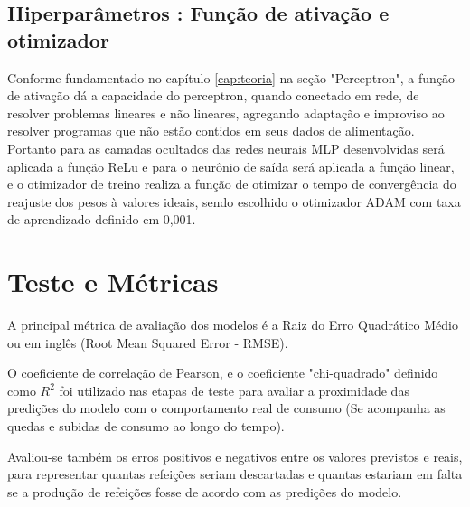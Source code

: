 	\subsection{Hiperparâmetros : Função de ativação e otimizador}
        Conforme fundamentado no capítulo \ref{cap:teoria} na seção "Perceptron", a função de ativação dá a capacidade do perceptron, quando conectado em rede, de resolver problemas lineares e não lineares, agregando adaptação e improviso ao resolver programas que não estão contidos em seus dados de alimentação.
        Portanto para as camadas ocultados das redes neurais MLP desenvolvidas será aplicada a função ReLu e para o neurônio de saída será aplicada a função linear, e o otimizador de treino realiza a função de otimizar o tempo de convergência do reajuste dos pesos à valores ideais, sendo escolhido o otimizador ADAM com taxa de aprendizado definido em 0,001.

    \section{Teste e Métricas}
       A principal métrica de avaliação dos modelos é a Raiz do Erro Quadrático Médio ou em inglês (Root Mean Squared Error - RMSE).
       
        O coeficiente de correlação de Pearson, e o coeficiente "chi-quadrado" definido como $R^2$ foi utilizado nas etapas de teste para avaliar a proximidade das predições do modelo com o comportamento real de consumo (Se acompanha as quedas e subidas de consumo ao longo do tempo).\newline
       
       
       
       Avaliou-se também os erros positivos e negativos entre os valores previstos e reais, para representar quantas refeições seriam descartadas e quantas estariam em falta se a produção de refeições fosse de acordo com as predições do modelo.
       
